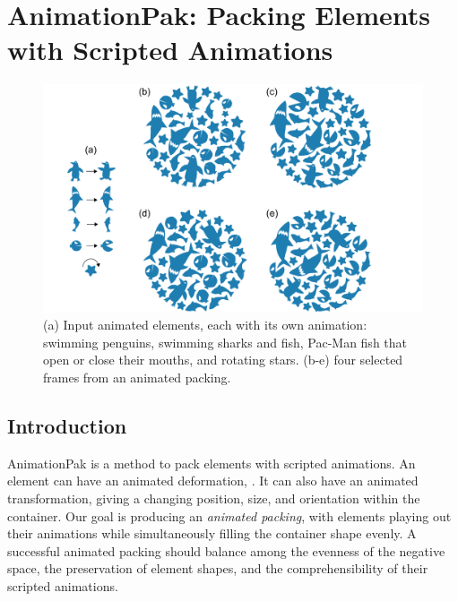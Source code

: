 \chapter{AnimationPak: Packing Elements with Scripted Animations}
\label{chapter_animationpak}

\begin{figure}[h!]
  \centering
  \vspace{-30pt}
  \includegraphics[width=1.0\textwidth]{figures/animationpak/teaser.pdf}
  \caption[An animated packing of aquatic fauna]
  {\label{fig_animationpak_teaser}
  (a) Input animated elements,
  each with its own animation: swimming penguins, swimming sharks and fish,
  Pac-Man fish that open or close their mouths, and rotating stars. 
  (b-e) four selected frames from an animated packing.  
  }
\end{figure}



\section{Introduction}
\label{animationpak_introduction}


AnimationPak is a method to pack elements with scripted animations.
An element can have an animated deformation, .
It can also have an animated transformation, giving a changing
position, size, and orientation within the container.
Our goal is producing an \textit{animated packing}, with elements
playing out their animations while simultaneously filling the
container shape evenly.  A successful animated packing should balance
among the evenness of the negative space, the preservation of 
element shapes, and the comprehensibility of their scripted animations.

